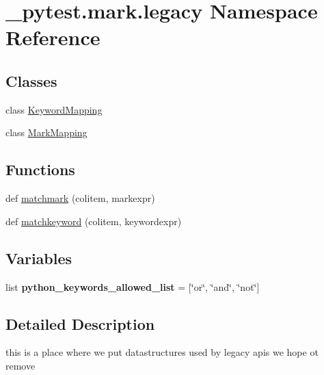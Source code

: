 \hypertarget{namespace__pytest_1_1mark_1_1legacy}{}\section{\+\_\+pytest.\+mark.\+legacy Namespace Reference}
\label{namespace__pytest_1_1mark_1_1legacy}
\subsection*{Classes}
\begin{DoxyCompactItemize}
\item 
class \hyperlink{class__pytest_1_1mark_1_1legacy_1_1_keyword_mapping}{Keyword\+Mapping}
\item 
class \hyperlink{class__pytest_1_1mark_1_1legacy_1_1_mark_mapping}{Mark\+Mapping}
\end{DoxyCompactItemize}
\subsection*{Functions}
\begin{DoxyCompactItemize}
\item 
def \hyperlink{namespace__pytest_1_1mark_1_1legacy_aebb420ac9ffedfce611e0d4a1f53bb4f}{matchmark} (colitem, markexpr)
\item 
def \hyperlink{namespace__pytest_1_1mark_1_1legacy_a6ecd9fada978a1d0bb67c5ccfad4bf2d}{matchkeyword} (colitem, keywordexpr)
\end{DoxyCompactItemize}
\subsection*{Variables}
\begin{DoxyCompactItemize}
\item 
\mbox{\label{namespace__pytest_1_1mark_1_1legacy_aafef3f6a6baf98473d382c629d7edeab}} 
list {\bfseries python\+\_\+keywords\+\_\+allowed\+\_\+list} = \mbox{[}\char`\"{}or\char`\"{}, \char`\"{}and\char`\"{}, \char`\"{}not\char`\"{}\mbox{]}
\end{DoxyCompactItemize}


\subsection{Detailed Description}
\begin{DoxyVerb}this is a place where we put datastructures used by legacy apis
we hope ot remove
\end{DoxyVerb}
 

